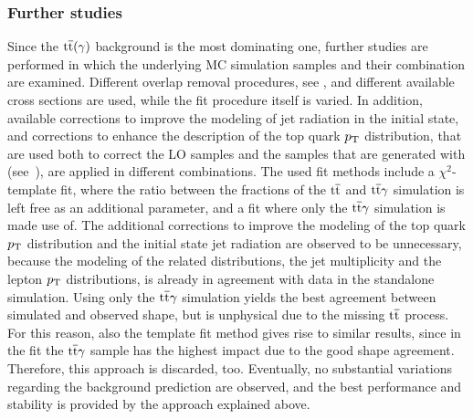 \subsubsection*{Further studies}
Since the ${\mathrm{t}\overline{\mathrm{t}}}(\gamma)$ background is the most dominating one, further studies are performed in which the underlying MC simulation samples and their combination are examined. Different overlap removal procedures, see , and different available cross sections are used, while the fit procedure itself is varied. In addition, available corrections to improve the modeling of jet radiation in the initial state, and corrections to enhance the description of the top quark $p_{\mathrm{T}}$ distribution, that are used both to correct the LO samples and the samples that are generated with \POWHEG (see~), are applied in different combinations. The used fit methods include a $\chi^2$-template fit, where the ratio between the fractions of the ${\mathrm{t}\overline{\mathrm{t}}}$ and ${\mathrm{t}\overline{\mathrm{t}}}\gamma$ simulation is left free as an additional parameter, and a fit where only the ${\mathrm{t}\overline{\mathrm{t}}}\gamma$ simulation is made use of. The additional corrections to improve the modeling of the top quark $p_{\mathrm{T}}$ distribution and the initial state jet radiation are observed to be unnecessary, because the modeling of the related distributions, \ie the jet multiplicity and the lepton $p_{\mathrm{T}}$ distributions, is already in agreement with data in the standalone simulation. Using only the ${\mathrm{t}\overline{\mathrm{t}}}\gamma$ simulation yields the best agreement between simulated and observed shape, but is unphysical due to the missing ${\mathrm{t}\overline{\mathrm{t}}}$ process. For this reason, also the template fit method gives rise to similar results, since in the fit the ${\mathrm{t}\overline{\mathrm{t}}}\gamma$ sample has the highest impact due to the good shape agreement. Therefore, this approach is discarded, too. Eventually, no substantial variations regarding the background prediction are observed, and the best performance and stability is provided by the approach explained above.

